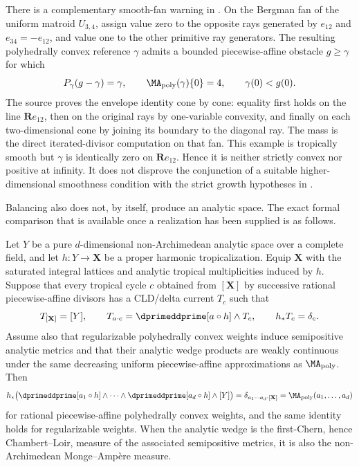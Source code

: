 There is a complementary smooth-fan warning in
\cite[Example~6.24, Claim~6.25, and Remark~6.26]{BMPS26}.  On the Bergman
fan of the uniform matroid \(U_{3,4}\), assign value zero to the opposite
rays generated by \(e_{12}\) and \(e_{34}=-e_{12}\), and value one to the
other primitive ray generators.  The resulting polyhedrally convex
reference \(\gamma\) admits a bounded piecewise-affine obstacle \(g\geq
\gamma\) for which
\[
 P_\gamma(g-\gamma)=\gamma,
 \qquad
 \MA_{\mathrm{poly}}(\gamma)\{0\}=4,
 \qquad
 \gamma(0)<g(0).
\]
The source proves the envelope identity cone by cone: equality first holds
on the line \(\mathbf R e_{12}\), then on the original rays by one-variable
convexity, and finally on each two-dimensional cone by joining its boundary
to the diagonal ray.  The mass is the direct iterated-divisor computation
on that fan.  This example is tropically smooth but \(\gamma\) is identically
zero on \(\mathbf R e_{12}\).  Hence it is neither strictly convex nor
positive at infinity.  It does not disprove the conjunction of a suitable
higher-dimensional smoothness condition with the strict growth hypotheses
in .

Balancing also does not, by itself, produce an analytic space.  The exact
formal comparison that is available once a realization has been supplied is
as follows.

\begin{proposition}\label{prop:frontier-polyhedral-recursive-realization}
Let \(Y\) be a pure \(d\)-dimensional non-Archimedean analytic space over a
complete field, and let \(h:Y\to\mathbf X\) be a proper harmonic
tropicalization.  Equip \(\mathbf X\) with the saturated integral
lattices and analytic tropical multiplicities induced by \(h\).  Suppose
that every tropical cycle \(c\) obtained from \([\mathbf X]\) by successive
rational piecewise-affine divisors has a CLD/delta current \(T_c\) such
that
\begin{equation}
 T_{[\mathbf X]}=[Y],\qquad
 T_{a\cdot c}=\dprimeddprime[a\circ h]\wedge T_c,
 \qquad h_*T_c=\delta_c.
 \label{eq:frontier-polyhedral-recursive-current}
\end{equation}
Assume also that regularizable polyhedrally convex weights induce
semipositive analytic metrics and that their analytic wedge products are
weakly continuous under the same decreasing uniform piecewise-affine
approximations as \(\MA_{\mathrm{poly}}\).  Then
\begin{equation}
 h_*\bigl(
  \dprimeddprime[a_1\circ h]\wedge\cdots\wedge
  \dprimeddprime[a_d\circ h]\wedge[Y]
 \bigr)
 =\delta_{a_1\cdots a_d\cdot[\mathbf X]}
 =\MA_{\mathrm{poly}}(a_1,\ldots,a_d)
 \label{eq:frontier-polyhedral-realization-comparison}
\end{equation}
for rational piecewise-affine polyhedrally convex weights, and the same
identity holds for regularizable weights.  When the analytic wedge is the
first-Chern, hence Chambert--Loir, measure of the associated semipositive
metrics, it is also the non-Archimedean Monge--Amp\`ere measure.
\end{proposition}

